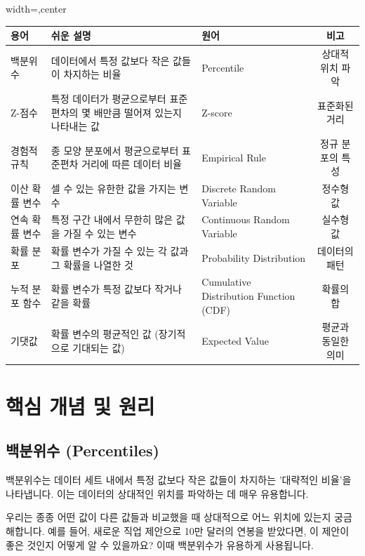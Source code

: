 \documentclass[11pt,a4paper]{book}
\theoremstyle{definition}
\begin{document}
\begin{adjustbox}{width=\textwidth,center}
\begin{tabular}{lllc}
\toprule
\textbf{용어} & \textbf{쉬운 설명} & \textbf{원어} & \textbf{비고} \\
\midrule
백분위수 & 데이터에서 특정 값보다 작은 값들이 차지하는 비율 & Percentile & 상대적 위치 파악 \\
Z-점수 & 특정 데이터가 평균으로부터 표준편차의 몇 배만큼 떨어져 있는지 나타내는 값 & Z-score & 표준화된 거리 \\
경험적 규칙 & 종 모양 분포에서 평균으로부터 표준편차 거리에 따른 데이터 비율 & Empirical Rule & 정규 분포의 특성 \\
이산 확률 변수 & 셀 수 있는 유한한 값을 가지는 변수 & Discrete Random Variable & 정수형 값 \\
연속 확률 변수 & 특정 구간 내에서 무한히 많은 값을 가질 수 있는 변수 & Continuous Random Variable & 실수형 값 \\
확률 분포 & 확률 변수가 가질 수 있는 각 값과 그 확률을 나열한 것 & Probability Distribution & 데이터의 패턴 \\
누적 분포 함수 & 확률 변수가 특정 값보다 작거나 같을 확률 & Cumulative Distribution Function (CDF) & 확률의 합 \\
기댓값 & 확률 변수의 평균적인 값 (장기적으로 기대되는 값) & Expected Value & 평균과 동일한 의미 \\
\bottomrule
\end{tabular}
\end{adjustbox}


\section{핵심 개념 및 원리}

\subsection{백분위수 (Percentiles)}

\begin{summarybox}[title=백분위수 핵심 요약]
백분위수는 데이터 세트 내에서 특정 값보다 작은 값들이 차지하는 '대략적인 비율'을 나타냅니다. 이는 데이터의 상대적인 위치를 파악하는 데 매우 유용합니다.
\end{summarybox}

우리는 종종 어떤 값이 다른 값들과 비교했을 때 상대적으로 어느 위치에 있는지 궁금해합니다. 예를 들어, 새로운 직업 제안으로 10만 달러의 연봉을 받았다면, 이 제안이 좋은 것인지 어떻게 알 수 있을까요? 이때 백분위수가 유용하게 사용됩니다.
\end{document}
